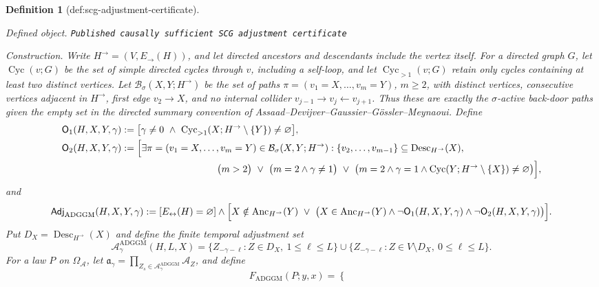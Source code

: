 \documentclass{article}
\newtheorem{definition}{Definition}
\begin{document}
\begin{definition}[def:scg-adjustment-certificate]\label{def:scg-adjustment-certificate}
\par\smallskip\noindent\emph{Defined object.} \texttt{Published causally sufficient SCG adjustment certificate}
\par\smallskip\noindent\emph{Construction.} Write \(H^{\to}=(V,E_{\to}(H))\), and let directed ancestors and descendants include the vertex itself.  For a directed graph \(G\), let \(\operatorname{Cyc}(v;G)\) be the set of simple directed cycles through \(v\), including a self-loop, and let \(\operatorname{Cyc}_{>1}(v;G)\) retain only cycles containing at least two distinct vertices.  Let \(\mathcal B_{\sigma}(X,Y;H^{\to})\) be the set of paths \(\pi=(v_1=X,\ldots,v_m=Y)\), \(m\ge 2\), with distinct vertices, consecutive vertices adjacent in \(H^{\to}\), first edge \(v_2\to X\), and no internal collider \(v_{j-1}\to v_j\leftarrow v_{j+1}\).  Thus these are exactly the \(\sigma\)-active back-door paths given the empty set in the directed summary convention of Assaad--Devijver--Gaussier--G\"ossler--Meynaoui.  Define
\[
 \begin{split}
 \mathsf O_1(H,X,Y,\gamma)
 &:=\bigl[\gamma\ne0\ \wedge\
 \operatorname{Cyc}_{>1}(X;H^{\to}\setminus\{Y\})\ne\varnothing\bigr],\\
 \mathsf O_2(H,X,Y,\gamma)
 &:=\Bigl[\exists\pi=(v_1=X,\ldots,v_m=Y)\in
 \mathcal B_{\sigma}(X,Y;H^{\to}):
 \{v_2,\ldots,v_{m-1}\}\subseteq
 \operatorname{Desc}_{H^{\to}}(X),\\
 &\hspace{35mm}\bigl(m>2\bigr)\ \vee\
 \bigl(m=2\wedge\gamma\ne1\bigr)\ \vee\
 \bigl(m=2\wedge\gamma=1\wedge
 \operatorname{Cyc}(Y;H^{\to}\setminus\{X\})\ne\varnothing\bigr)
 \Bigr],
 \end{split}
\]
and
\[
 \mathsf{Adj}_{\mathrm{ADGGM}}(H,X,Y,\gamma)
 :=[E_{\leftrightarrow}(H)=\varnothing]\wedge
 \Bigl[X\notin\operatorname{Anc}_{H^{\to}}(Y)\ \vee\
 \bigl(X\in\operatorname{Anc}_{H^{\to}}(Y)\wedge
 \neg\mathsf O_1(H,X,Y,\gamma)\wedge
 \neg\mathsf O_2(H,X,Y,\gamma)\bigr)\Bigr].
\]
Put \(D_X=\operatorname{Desc}_{H^{\to}}(X)\) and define the finite temporal adjustment set
\[
 \mathcal A_{\gamma}^{\mathrm{ADGGM}}(H,L,X)
 =\{Z_{-\gamma-\ell}:Z\in D_X,\ 1\le\ell\le L\}
 \cup
 \{Z_{-\gamma-\ell}:Z\in V\setminus D_X,\ 0\le\ell\le L\}.
\]
For a law \(P\) on \(\Omega_{\mathcal A}\), let
\(\mathfrak a_{\gamma}=\prod_{Z_s\in\mathcal A_{\gamma}^{\mathrm{ADGGM}}}\mathcal A_Z\), and define
\[
 F_{\mathrm{ADGGM}}(P;y,x)=
 \begin{cases}

\end{cases}\]
\end{definition}
\end{document}
